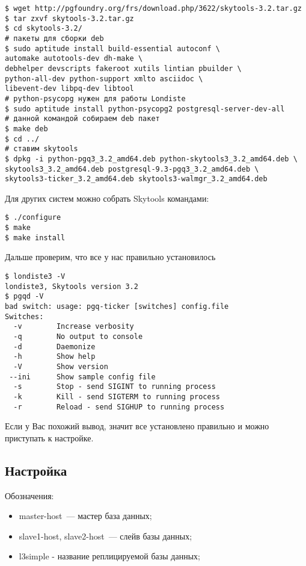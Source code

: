 \begin{lstlisting}[label=lst:londiste2,caption=Установка]
$ wget http://pgfoundry.org/frs/download.php/3622/skytools-3.2.tar.gz
$ tar zxvf skytools-3.2.tar.gz
$ cd skytools-3.2/
# пакеты для сборки deb
$ sudo aptitude install build-essential autoconf \
automake autotools-dev dh-make \
debhelper devscripts fakeroot xutils lintian pbuilder \
python-all-dev python-support xmlto asciidoc \
libevent-dev libpq-dev libtool
# python-psycopg нужен для работы Londiste
$ sudo aptitude install python-psycopg2 postgresql-server-dev-all
# данной командой собираем deb пакет
$ make deb
$ cd ../
# ставим skytools
$ dpkg -i python-pgq3_3.2_amd64.deb python-skytools3_3.2_amd64.deb \
skytools3_3.2_amd64.deb postgresql-9.3-pgq3_3.2_amd64.deb \
skytools3-ticker_3.2_amd64.deb skytools3-walmgr_3.2_amd64.deb
\end{lstlisting}

Для других систем можно собрать Skytools командами:

\begin{lstlisting}[label=lst:londiste3,caption=Установка]
$ ./configure
$ make
$ make install
\end{lstlisting}

Дальше проверим, что все у нас правильно установилось
\begin{lstlisting}[label=lst:londiste4,caption=Установка]
$ londiste3 -V
londiste3, Skytools version 3.2
$ pgqd -V
bad switch: usage: pgq-ticker [switches] config.file
Switches:
  -v        Increase verbosity
  -q        No output to console
  -d        Daemonize
  -h        Show help
  -V        Show version
 --ini      Show sample config file
  -s        Stop - send SIGINT to running process
  -k        Kill - send SIGTERM to running process
  -r        Reload - send SIGHUP to running process
\end{lstlisting}

Если у Вас похожий вывод, значит все установлено правильно и можно приступать к настройке.


\subsection{Настройка}

Обозначения:
\begin{itemize}
  \item master-host~--- мастер база данных;
  \item slave1-host, slave2-host~--- слейв базы данных;
  \item l3simple - название реплицируемой базы данных;
\end{itemize}

